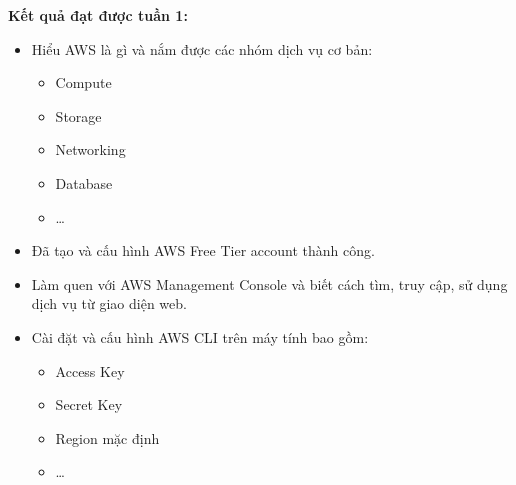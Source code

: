 \vspace{0.5em}\noindent\textbf{Kết quả đạt được tuần
1:}\par

\begin{itemize}
\item
  Hiểu AWS là gì và nắm được các nhóm dịch vụ cơ bản:

  \begin{itemize}
  \tightlist
  \item
    Compute
  \item
    Storage
  \item
    Networking
  \item
    Database
  \item
    \ldots{}
  \end{itemize}
\item
  Đã tạo và cấu hình AWS Free Tier account thành công.
\item
  Làm quen với AWS Management Console và biết cách tìm, truy cập, sử
  dụng dịch vụ từ giao diện web.
\item
  Cài đặt và cấu hình AWS CLI trên máy tính bao gồm:

  \begin{itemize}
  \tightlist
  \item
    Access Key
  \item
    Secret Key
  \item
    Region mặc định
  \item
    \ldots{}
  \end{itemize}
\end{itemize}
